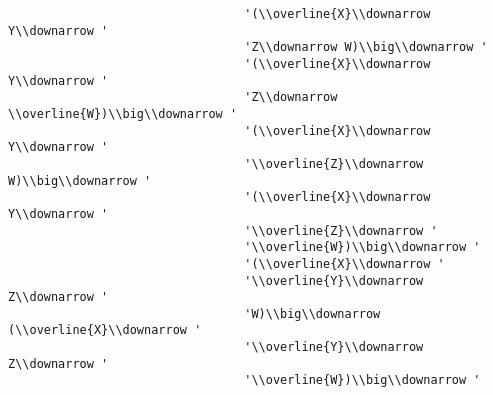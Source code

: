 \begin{verbatim}
                                 '(\\overline{X}\\downarrow Y\\downarrow '
                                 'Z\\downarrow W)\\big\\downarrow '
                                 '(\\overline{X}\\downarrow Y\\downarrow '
                                 'Z\\downarrow \\overline{W})\\big\\downarrow '
                                 '(\\overline{X}\\downarrow Y\\downarrow '
                                 '\\overline{Z}\\downarrow W)\\big\\downarrow '
                                 '(\\overline{X}\\downarrow Y\\downarrow '
                                 '\\overline{Z}\\downarrow '
                                 '\\overline{W})\\big\\downarrow '
                                 '(\\overline{X}\\downarrow '
                                 '\\overline{Y}\\downarrow Z\\downarrow '
                                 'W)\\big\\downarrow (\\overline{X}\\downarrow '
                                 '\\overline{Y}\\downarrow Z\\downarrow '
                                 '\\overline{W})\\big\\downarrow '

\end{verbatim}
